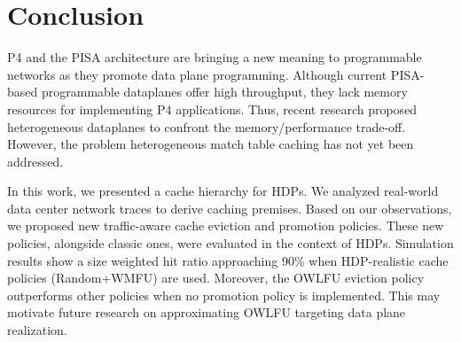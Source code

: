 \section{Conclusion}\label{sec:conclusion}

P4 and the PISA architecture are bringing a new meaning to programmable networks as they promote data plane programming.
Although current PISA-based programmable dataplanes offer high throughput, they lack memory resources for implementing P4 applications.
Thus, recent research proposed heterogeneous dataplanes to confront the memory/performance trade-off.
However, the problem heterogeneous match table caching has not yet been addressed.

In this work, we presented a cache hierarchy for HDPs.
We analyzed real-world data center network traces to derive caching premises.
Based on our observations, we proposed new traffic-aware cache eviction and promotion policies.
These new policies, alongside classic ones, were evaluated in the context of HDPs.
Simulation results show a size weighted hit ratio approaching 90\% when HDP-realistic cache policies (Random+WMFU) are used.
Moreover, the OWLFU eviction policy outperforms other policies when no promotion policy is implemented.
This may motivate future research on approximating OWLFU targeting data plane realization.